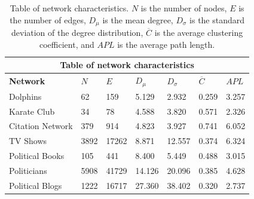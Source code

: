 \documentclass[11pt]{article}
\begin{document}
\begin{table}[H]
    \begin{center}
        
    \begin{tabular}{ |p{3cm}||p{1.6cm}|p{1.6cm}|p{1.6cm}|p{1.6cm}|p{1.6cm}|p{1.6cm}|}
        \hline
        \multicolumn{7}{|c|}{Table of network characteristics} \\
        \hline
        \bf{Network} & $N$ & $E$ & $D_{\mu}$ & $D_{\sigma}$ & $\overline{C}$ & $APL$\\
        \hline
        Dolphins   & 62    &159&   5.129&   2.932 &   0.259 & 3.257\\
        Karate Club &34	&78	&4.588&	3.820&	0.571&	2.326\\
        Citation Network & 379 &	914	& 4.823	& 3.927 & 0.741 & 6.052 \\
        TV Shows & 3892 & 17262&8.871 & 12.557 & 0.374&6.324\\
        Political Books &105 &	441	& 8.400 &	5.449 &	0.488 &	3.015\\
        Politicians&  5908 &41729 & 14.126 & 20.096 &	0.385 & 4.628\\
        Political Blogs &	1222 & 16717 & 27.360 & 38.402 & 0.320 & 2.737\\
        \hline
    \end{tabular}
    \end{center}
    \caption{Table of network characteristics. $N$ is the number of nodes, $E$ is the number of edges, $D_{\mu}$ is the mean degree, $D_{\sigma}$ is the standard deviation of the degree distribution, $\overline{C}$ is the average clustering coefficient, and $APL$ is the average path length. }
    \label{table:characteristics}
    \end{table}
\end{document}

